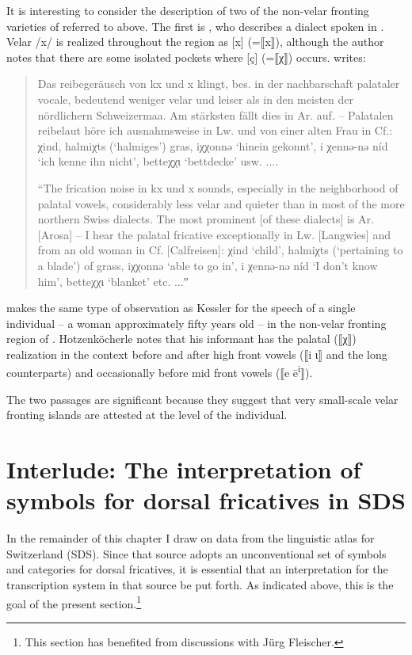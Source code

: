 {It is interesting to consider the description of two of the non-velar fronting varieties of  referred to above. The first is \citet{Kessler1931}, who describes a dialect spoken in . Velar /x/ is realized throughout the region as [x] (=⟦x⟧), although the author notes that there are some isolated pockets where [ç] (=⟦χ⟧) occurs. \citet[105]{Kessler1931} writes:

\begin{quote}\sloppy
Das reibegeräusch von kx und x klingt, bes. in der nachbarschaft palataler vocale, bedeutend weniger velar und leiser als in den meisten der nördlichern Schweizermaa. Am stärksten fällt dies in Ar. auf. – Palatalen reibelaut höre ich ausnahmsweise in Lw. und von einer alten Frau in Cf.: χind, halmiχts (‘halmiges’) gras, iχχonnə ‘hinein gekonnt’, i χennə-nə níd ‘ich kenne ihn nicht’, betteχχɩ ‘bettdecke’ usw. ....

“The frication noise in kx und x sounds, especially in the neighborhood of palatal vowels, considerably less velar and quieter than in most of the more northern Swiss dialects. The most prominent [of these dialects] is Ar. [Arosa] – I hear the palatal fricative exceptionally in Lw. [Langwies] and from an old woman in Cf. [Calfreisen]: χind ‘child’, halmiχts (‘pertaining to a blade’) of grass, iχχonnə ‘able to go in’, i χennə-nə níd ‘I don’t know him’, betteχχɩ ‘blanket’ etc. ...ˮ
\end{quote}

\citet[316--317]{Hotzenköcherle1934} makes the same type of observation as Kessler for the speech of a single individual -- a woman approximately fifty years old -- in the non-velar fronting region of . Hotzenköcherle notes that his informant has the palatal (⟦χ⟧) realization in the context before and after high front vowels (⟦i ɩ⟧ and the long counterparts) and occasionally before mid front vowels (⟦e ē\textsuperscript{i}⟧).

The two passages are significant because they suggest that very small-scale velar fronting islands are attested at the level of the individual.

\section{{Interlude:} {The} {interpretation} {of} {symbols} {for} {dorsal} {fricatives} {in} {SDS}}\label{sec:15.7}

In the remainder of this chapter I draw on data from the linguistic atlas for Switzerland (SDS). Since that source adopts an unconventional set of symbols and categories for dorsal fricatives, it is essential that an interpretation for the transcription system in that source be put forth. As indicated above, this is the goal of the present section.\footnote{This section has benefited from discussions with Jürg Fleischer.}

}
